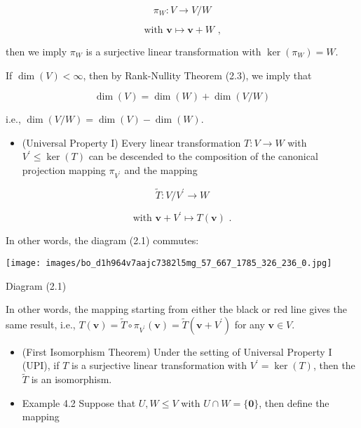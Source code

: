 \documentclass[11pt]{article}
\begin{document}
\[
{\pi }_{W} : V \rightarrow  V/W
\]

\[
\text{ with }\mathbf{v} \mapsto  \mathbf{v} + W\text{ , }
\]

then we imply \({\pi }_{W}\) is a surjective linear transformation with \(\ker \left( {\pi }_{W}\right)  = W\).

If \(\dim \left( V\right)  < \infty\), then by Rank-Nullity Theorem (2.3), we imply that

\[
\dim \left( V\right)  = \dim \left( W\right)  + \dim \left( {V/W}\right)
\]

i.e., \(\dim \left( {V/W}\right)  = \dim \left( V\right)  - \dim \left( W\right)\).

\begin{itemize}
\item (Universal Property I) Every linear transformation \(T : V \rightarrow  W\) with \({V}^{\prime } \leq  \ker \left( T\right)\) can be descended to the composition of the canonical projection mapping \({\pi }_{{V}^{\prime }}\) and the mapping
\end{itemize}

\[
\widetilde{T} : V/{V}^{\prime } \rightarrow  W
\]

\[
\text{ with }\mathbf{v} + {V}^{\prime } \mapsto  T\left( \mathbf{v}\right) \text{ . }
\]

In other words, the diagram (2.1) commutes:

\begin{center}
\texttt{[image: images/bo\_d1h964v7aajc7382l5mg\_57\_667\_1785\_326\_236\_0.jpg]}
\end{center}
\hspace*{3em} 

Diagram (2.1)

In other words, the mapping starting from either the black or red line gives the same result, i.e., \(T\left( \mathbf{v}\right)  = \widetilde{T} \circ  {\pi }_{{V}^{\prime }}\left( \mathbf{v}\right)  = \widetilde{T}\left( {\mathbf{v} + {V}^{\prime }}\right)\) for any \(\mathbf{v} \in  V\).

\begin{itemize}
\item (First Isomorphism Theorem) Under the setting of Universal Property I (UPI), if \(T\) is a surjective linear transformation with \({V}^{\prime } = \ker \left( T\right)\), then the \(\widetilde{T}\) is an isomorphism.
\end{itemize}

\begin{itemize}
\item Example 4.2 Suppose that \(U,W \leq  V\) with \(U \cap  W = \{ \mathbf{0}\}\), then define the mapping
\end{itemize}
\end{document}
